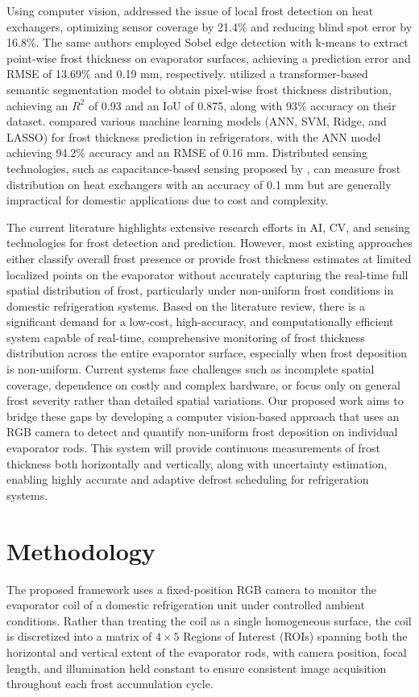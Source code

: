\documentclass[a4paper,fleqn]{cas-dc}
\begin{document}
Using computer vision, \citet{aguiar2023local} addressed the issue of local frost detection on heat exchangers, optimizing sensor coverage by 21.4\% and reducing blind spot error by 16.8\%. The same authors \citep{rahman2024sobel} employed Sobel edge detection with k-means to extract point-wise frost thickness on evaporator surfaces, achieving a prediction error and RMSE of 13.69\% and 0.19 mm, respectively. \citet{elahi2026transformer} utilized a transformer-based semantic segmentation model to obtain pixel-wise frost thickness distribution, achieving an $R^2$ of 0.93 and an IoU of 0.875, along with 93\% accuracy on their dataset. \citet{han2023comparison} compared various machine learning models (ANN, SVM, Ridge, and LASSO) for frost thickness prediction in refrigerators, with the ANN model achieving 94.2\% accuracy and an RMSE of 0.16 mm. Distributed sensing technologies, such as capacitance-based sensing proposed by \citet{shen2023capacitance}, can measure frost distribution on heat exchangers with an accuracy of 0.1 mm but are generally impractical for domestic applications due to cost and complexity.

The current literature highlights extensive research efforts in AI, CV, and sensing technologies for frost detection and prediction. However, most existing approaches either classify overall frost presence or provide frost thickness estimates at limited localized points on the evaporator without accurately capturing the real-time full spatial distribution of frost, particularly under non-uniform frost conditions in domestic refrigeration systems. Based on the literature review, there is a significant demand for a low-cost, high-accuracy, and computationally efficient system capable of real-time, comprehensive monitoring of frost thickness distribution across the entire evaporator surface, especially when frost deposition is non-uniform. Current systems face challenges such as incomplete spatial coverage, dependence on costly and complex hardware, or focus only on general frost severity rather than detailed spatial variations. Our proposed work aims to bridge these gaps by developing a computer vision-based approach that uses an RGB camera to detect and quantify non-uniform frost deposition on individual evaporator rods. This system will provide continuous measurements of frost thickness both horizontally and vertically, along with uncertainty estimation, enabling highly accurate and adaptive defrost scheduling for refrigeration systems.

\section{Methodology}\label{sec:methodology}
The proposed framework uses a fixed-position RGB camera to monitor the evaporator coil of a domestic refrigeration unit under controlled ambient conditions. Rather than treating the coil as a single homogeneous surface, the coil is discretized into a matrix of $4 \times 5$ Regions of Interest (ROIs) spanning both the horizontal and vertical extent of the evaporator rods, with camera position, focal length, and illumination held constant to ensure consistent image acquisition throughout each frost accumulation cycle.
\end{document}
